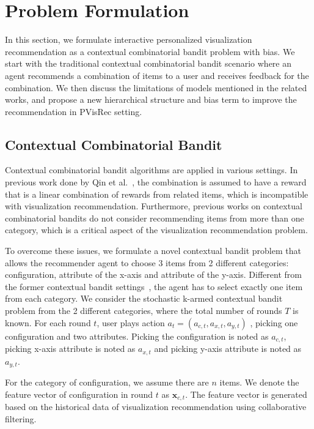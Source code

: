 
\section{Problem Formulation}
In this section, we formulate interactive personalized visualization recommendation as a contextual combinatorial bandit problem with bias. 
We start with the traditional contextual combinatorial bandit scenario where an agent recommends a combination of items to a user and receives feedback for the combination. We then discuss the limitations of models mentioned in the related works, and propose a new hierarchical structure and bias term to improve the recommendation in PVisRec setting.

\subsection{Contextual Combinatorial Bandit}
Contextual combinatorial bandit algorithms are applied in various settings. In previous work done by Qin et al.~\cite{qin_contextual_2014}, the combination is assumed to have a reward that is a linear combination of rewards from related items, which is incompatible with visualization recommendation. 
Furthermore, previous works on contextual combinatorial bandits do not consider recommending items from more than one category, which is a critical aspect of the visualization recommendation problem.

To overcome these issues, we formulate a novel contextual bandit problem that allows the recommender agent to choose 3 items from 2 different categories: configuration, attribute of the x-axis and attribute of the y-axis. Different from the former contextual bandit settings~\cite{qin_contextual_2014}, the agent has to select exactly one item from each category. 
We consider the stochastic k-armed contextual bandit problem from the 2 different categories, where the total number of rounds $T$ is known. 
For each round $t$, user plays action $a_t=(a_{c,t},a_{x,t},a_{y,t})$ , picking one configuration and two attributes. Picking the configuration is noted as $a_{c,t}$, picking x-axis attribute is noted as $a_{x,t}$ and picking y-axis attribute is noted as $a_{y,t}$.

For the category of configuration, we assume there are $n$ items. We denote the feature vector of configuration in round $t$ as $\mathbf x_{c,t}$. 
The feature vector is generated based on the historical data of visualization recommendation using collaborative filtering. 

